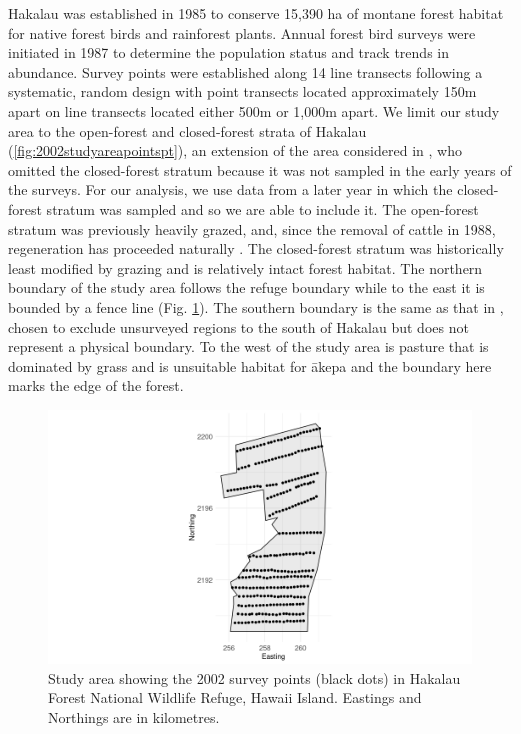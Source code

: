 \documentclass{stylefile16/statsoc}
\newcommand{\akepa}{\textquotesingle\={a}kepa}  %
\newcommand{\hawaii}{Hawai\textquotesingle i}   %
\begin{document}
Hakalau was established in 1985 to conserve 15,390 ha of montane forest habitat for native forest birds and rainforest plants. Annual forest bird surveys were initiated in 1987 to determine the population status and track trends in abundance. Survey points were established along 14 line transects following a systematic, random design with point transects located approximately 150m apart on line transects located either 500m or 1,000m apart. We limit our study area to the open-forest and closed-forest strata of Hakalau (\autoref{fig:2002studyareapointspt}), an extension of the area considered in \cite{camp_population_2010, camp_statespace_2016}, who omitted the closed-forest stratum because it was not sampled in the early years of the surveys.  For our analysis, we use data from a later year in which the closed-forest stratum was sampled and so we are able to include it.  The open-forest stratum was previously heavily grazed, and, since the removal of cattle in 1988, regeneration has proceeded naturally \citep{maxfield_hakalau_1998}. The closed-forest stratum was historically least modified by grazing and is relatively intact forest habitat.  The northern boundary of the study area follows the refuge boundary while to the east it is bounded by a fence line (Fig. \ref{fig:2002studyareapointspt}). The southern boundary is the same as that in \cite{camp_population_2010}, chosen to exclude unsurveyed regions to the south of Hakalau but does not represent a physical boundary. To the west of the study area is pasture that is dominated by grass and is unsuitable habitat for \akepa{} and the boundary here marks the edge of the forest.

\begin{figure}[!htb]
	\centering
	\includegraphics[scale=0.5]{figures/study_area_design.png}
	\caption{Study area showing the 2002 survey points (black dots) in Hakalau Forest National Wildlife Refuge, \hawaii{} Island.  Eastings and Northings are in kilometres.}
	\label{fig:2002studyareapointspt}
\end{figure}
\end{document}
